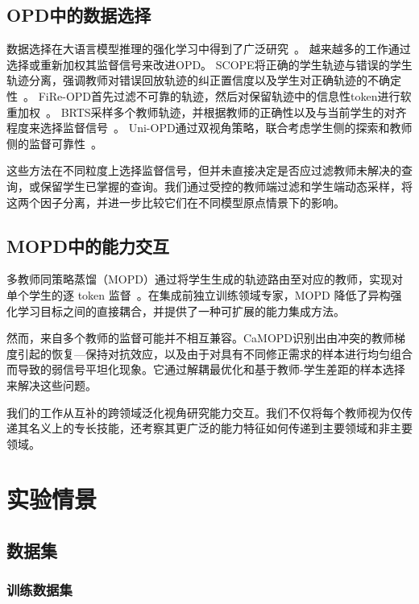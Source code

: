 \subsection{OPD中的数据选择}


数据选择在大语言模型推理的强化学习中得到了广泛研究~\cite{yu2026dapo,kong2026rethinking,li2025learnalign}。  
越来越多的工作通过选择或重新加权其监督信号来改进OPD。  
SCOPE将正确的学生轨迹与错误的学生轨迹分离，强调教师对错误回放轨迹的纠正置信度以及学生对正确轨迹的不确定性~\cite{zheng2026scope}。  
FiRe-OPD首先过滤不可靠的轨迹，然后对保留轨迹中的信息性token进行软重加权~\cite{li2026filter}。  
BRTS采样多个教师轨迹，并根据教师的正确性以及与当前学生的对齐程度来选择监督信号~\cite{zhang2026policy}。  
Uni-OPD通过双视角策略，联合考虑学生侧的探索和教师侧的监督可靠性~\cite{hou2026uni}。


这些方法在不同粒度上选择监督信号，但并未直接决定是否应过滤教师未解决的查询，或保留学生已掌握的查询。我们通过受控的教师端过滤和学生端动态采样，将这两个因子分离，并进一步比较它们在不同模型原点情景下的影响。

\subsection{MOPD中的能力交互}


多教师同策略蒸馏（MOPD）通过将学生生成的轨迹路由至对应的教师，实现对单个学生的逐 token 监督~\cite{ma2026mopd}。在集成前独立训练领域专家，MOPD 降低了异构强化学习目标之间的直接耦合，并提供了一种可扩展的能力集成方法。


然而，来自多个教师的监督可能并不相互兼容。CaMOPD识别出由冲突的教师梯度引起的恢复—保持对抗效应，以及由于对具有不同修正需求的样本进行均匀组合而导致的弱信号平坦化现象\cite{chen2026counteraction}。它通过解耦最优化和基于教师-学生差距的样本选择来解决这些问题。


我们的工作从互补的跨领域泛化视角研究能力交互。我们不仅将每个教师视为仅传递其名义上的专长技能，还考察其更广泛的能力特征如何传递到主要领域和非主要领域。

\section{实验情景}
\label{sec:appendix_exp_setting}

\subsection{数据集}
\label{sec:appendix_datasets}

\subsubsection{训练数据集}
\label{sec:appendix_training_datasets}

